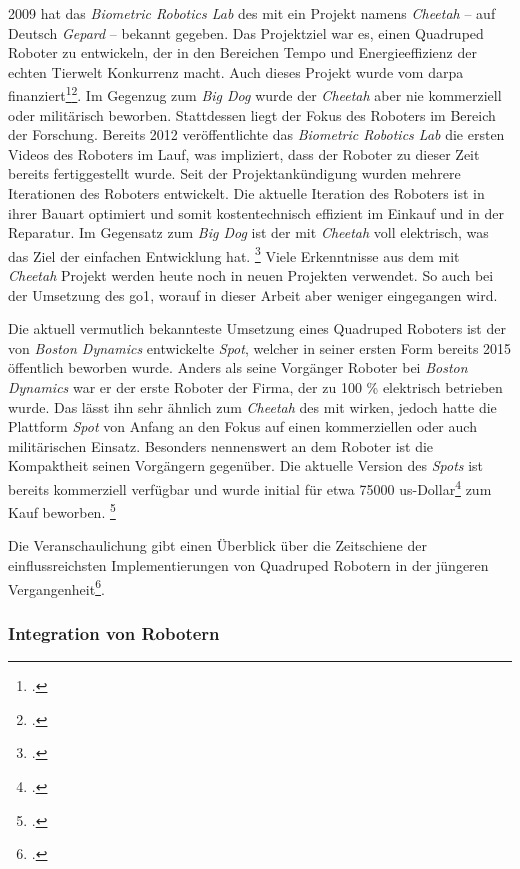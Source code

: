 \num{2009} hat das \emph{Biometric Robotics Lab} des \gls{mit} ein Projekt namens \emph{Cheetah} -- auf Deutsch \emph{Gepard} --
bekannt gegeben.
Das Projektziel war es, einen Quadruped Roboter zu entwickeln, der in den Bereichen Tempo und Energieeffizienz der echten
Tierwelt Konkurrenz macht.
Auch dieses Projekt wurde vom \gls{darpa} finanziert\footcite{bi_mit_cheetah_funding}\footcite{darpa_m3}.
Im Gegenzug zum \emph{Big Dog} wurde der \emph{Cheetah} aber nie kommerziell oder militärisch beworben.
Stattdessen liegt der Fokus des Roboters im Bereich der Forschung.
Bereits \num{2012} veröffentlichte das \emph{Biometric Robotics Lab} die ersten Videos des Roboters im Lauf, was impliziert,
dass der Roboter zu dieser Zeit bereits fertiggestellt wurde.
Seit der Projektankündigung wurden mehrere Iterationen des Roboters entwickelt.
Die aktuelle Iteration des Roboters ist in ihrer Bauart optimiert und somit kostentechnisch effizient im Einkauf und in der Reparatur.
Im Gegensatz zum \emph{Big Dog} ist der \gls{mit} \emph{Cheetah} voll elektrisch, was das Ziel der einfachen Entwicklung hat.
\footcite{ieee_spectrum_cheetah}
Viele Erkenntnisse aus dem \gls{mit} \emph{Cheetah} Projekt werden heute noch in neuen Projekten verwendet.
So auch bei der Umsetzung des \gls{go1}, worauf in dieser Arbeit aber weniger eingegangen wird.

Die aktuell vermutlich bekannteste Umsetzung eines Quadruped Roboters ist der von \emph{Boston Dynamics} entwickelte
\emph{Spot}, welcher in seiner ersten Form bereits \num{2015} öffentlich beworben wurde.
Anders als seine Vorgänger Roboter bei \emph{Boston Dynamics} war er der erste Roboter der Firma, der zu \num{100} \%
elektrisch betrieben wurde.
Das lässt ihn sehr ähnlich zum \emph{Cheetah} des \gls{mit} wirken, jedoch hatte die Plattform \emph{Spot} von Anfang an den
Fokus auf einen kommerziellen oder auch militärischen Einsatz.
Besonders nennenswert an dem Roboter ist die Kompaktheit seinen Vorgängern gegenüber.
Die aktuelle Version des \emph{Spots} ist bereits kommerziell verfügbar und wurde initial für etwa \num{75000} \gls{us}-Dollar\footcite{spot_price}
zum Kauf beworben.
\footcite{boston_dynamics_legacy}

Die Veranschaulichung  gibt einen Überblick über die Zeitschiene der einflussreichsten
Implementierungen von Quadruped Robotern in der jüngeren Vergangenheit\footcite{quadruped_timeline}.


\subsubsection{Integration von Robotern}
\label{subsubsec:integration}

